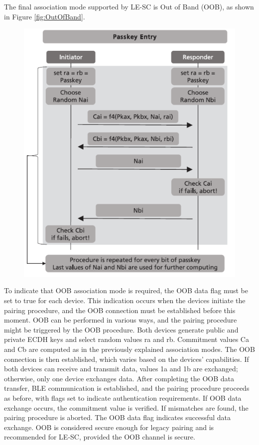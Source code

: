 \documentclass{Configuration_Files/PoliMi3i_thesis}
\begin{document}
The final association mode supported by LE-SC is Out of Band (OOB), as shown in Figure \ref{fig:OutOfBand}.

\begin{figure}[H]
    \centering
    \includegraphics[scale=0.7]{Bluetooth_Security/7.png}
    \label{fig:pairing_procedure}
\end{figure}

To indicate that OOB association mode is required, the OOB data flag must be set to true for each device. This indication occurs when the devices initiate the pairing procedure, and the OOB connection must be established before this moment. OOB can be performed in various ways, and the pairing procedure might be triggered by the OOB procedure. Both devices generate public and private ECDH keys and select random values ra and rb. Commitment values Ca and Cb are computed as in the previously explained association modes. The OOB connection is then established, which varies based on the devices' capabilities. If both devices can receive and transmit data, values 1a and 1b are exchanged; otherwise, only one device exchanges data. After completing the OOB data transfer, BLE communication is established, and the pairing procedure proceeds as before, with flags set to indicate authentication requirements. If OOB data exchange occurs, the commitment value is verified. If mismatches are found, the pairing procedure is aborted. The OOB data flag indicates successful data exchange. OOB is considered secure enough for legacy pairing and is recommended for LE-SC, provided the OOB channel is secure.
\end{document}
